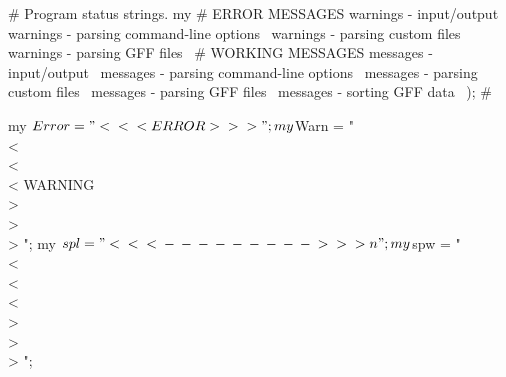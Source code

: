 \documentclass[11pt]{article}
\def\nwendcode{\endtrivlist \endgroup} %
\let\nwdocspar=\par                    %
\begin{document}

\nwenddocs{}\plusendmoddef
# Program status strings.
my %
    # ERROR MESSAGES
    \LA{}warnings - input/output~{\nwtagstyle{}}\RA{}
    \LA{}warnings - parsing command-line options~{\nwtagstyle{}}\RA{}
    \LA{}warnings - parsing custom files~{\nwtagstyle{}}\RA{}
    \LA{}warnings - parsing GFF files~{\nwtagstyle{}}\RA{}
    # WORKING MESSAGES
    \LA{}messages - input/output~{\nwtagstyle{}}\RA{}
    \LA{}messages - parsing command-line options~{\nwtagstyle{}}\RA{}
    \LA{}messages - parsing custom files~{\nwtagstyle{}}\RA{}
    \LA{}messages - parsing GFF files~{\nwtagstyle{}}\RA{}
    \LA{}messages - sorting GFF data~{\nwtagstyle{}}\RA{}
   ); # %
\nwendcode{}\nwdocspar


\nwenddocs{}\plusendmoddef
my $Error = "\\<\\<\\<  ERROR  \\>\\>\\> ";
my $Warn  = "\\<\\<\\< WARNING \\>\\>\\> ";
my $spl   = "\\<\\<\\<\\-\\-\\-\\-\\-\\-\\-\\-\\-\\>\\>\\>\\n";
my $spw   = "\\<\\<\\<         \\>\\>\\> ";
\nwendcode{}\nwdocspar
\end{document}
